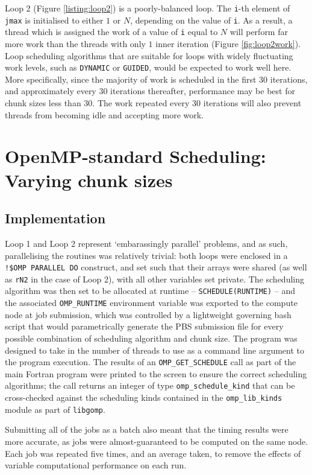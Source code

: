 \documentclass{article} %
\newcommand{\tp}{\texttt}
\begin{document}
Loop 2 (Figure \ref{listing:loop2}) is a poorly-balanced loop.
The \texttt{i}-th element of \texttt{jmax} is initialised to either $1$ or $N$, depending on the value of \texttt{i}.
As a result, a thread which is assigned the work of a value of \texttt{i} equal to $N$ will perform far more work than the threads with only $1$ inner iteration (Figure \ref{fig:loop2work}).
Loop scheduling algorithms that are suitable for loops with widely fluctuating work levels, such as \tp{DYNAMIC} or \tp{GUIDED}, would be expected to work well here.
More specifically, since the majority of work is scheduled in the first 30 iterations, and approximately every 30 iterations thereafter, performance may be best for chunk sizes less than 30.
The work repeated every 30 iterations will also prevent threads from becoming idle and accepting more work.

\section*{OpenMP-standard Scheduling: Varying chunk sizes}

\subsection*{Implementation}

Loop 1 and Loop 2 represent `embarassingly parallel' problems, and as such, parallelising the routines was relatively trivial: both loops were enclosed in a \tp{!\$OMP PARALLEL DO} construct, and set such that their arrays were shared (as well as \tp{rN2} in the case of Loop 2), with all other variables set private.
The scheduling algorithm was then set to be allocated at runtime -- \tp{SCHEDULE(RUNTIME)} -- and the associated \tp{OMP\_RUNTIME} environment variable was exported to the compute node at job submission, which was controlled by a lightweight governing bash script that would parametrically generate the PBS submission file for every possible combination of scheduling algorithm and chunk size.
The program was designed to take in the number of threads to use as a command line argument to the program execution.
The results of an \tp{OMP\_GET\_SCHEDULE} call as part of the main Fortran program were printed to the screen to ensure the correct scheduling algorithms; the call returns an integer of type \tp{omp\_schedule\_kind} that can be cross-checked against the scheduling kinds contained in the \tp{omp\_lib\_kinds} module as part of \tp{libgomp}.

Submitting all of the jobs as a batch also meant that the timing results were more accurate, as jobs were almost-guaranteed to be computed on the same node.
Each job was repeated five times, and an average taken, to remove the effects of variable computational performance on each run.
\end{document}
